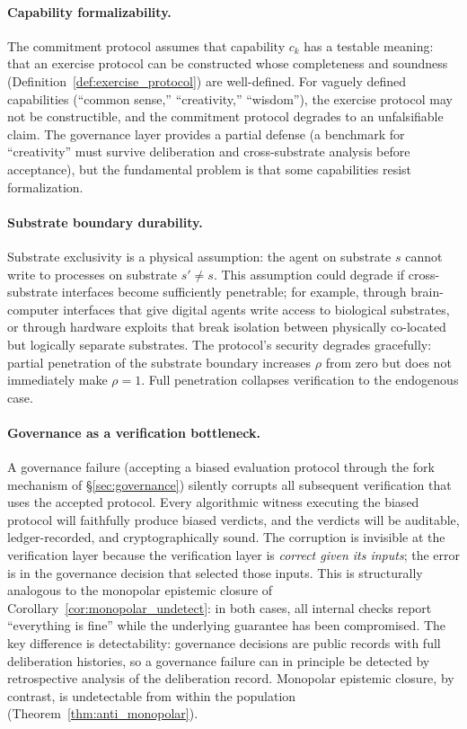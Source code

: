 \paragraph{Capability formalizability.}
The commitment protocol assumes that capability $c_k$ has a
testable meaning: that an exercise protocol can be constructed whose
completeness and soundness (Definition~\ref{def:exercise_protocol})
are well-defined.  For vaguely defined capabilities (``common
sense,'' ``creativity,'' ``wisdom''), the exercise protocol may not
be constructible, and the commitment protocol degrades to an
unfalsifiable claim.  The governance layer provides a partial defense
(a benchmark for ``creativity'' must survive deliberation and
cross-substrate analysis before acceptance), but the fundamental
problem is that some capabilities resist formalization.

\paragraph{Substrate boundary durability.}
Substrate exclusivity is a physical assumption: the agent on
substrate $s$ cannot write to processes on substrate $s' \neq s$.
This assumption could degrade if cross-substrate interfaces become
sufficiently penetrable; for example, through brain-computer
interfaces that give digital agents write access to biological
substrates, or through hardware exploits that break isolation
between physically co-located but logically separate substrates.
The protocol's security degrades gracefully: partial penetration of
the substrate boundary increases $\rho$ from zero but does not
immediately make $\rho = 1$.  Full penetration collapses verification
to the endogenous case.

\paragraph{Governance as a verification bottleneck.}
A governance failure (accepting a biased evaluation protocol through
the fork mechanism of \S\ref{sec:governance}) silently corrupts all
subsequent verification that uses the accepted protocol.  Every
algorithmic witness executing the biased protocol will faithfully
produce biased verdicts, and the verdicts will be auditable,
ledger-recorded, and cryptographically sound.  The corruption is
invisible at the verification layer because the verification layer
is \emph{correct given its inputs}; the error is in the governance
decision that selected those inputs.  This is structurally analogous
to the monopolar epistemic closure of
Corollary~\ref{cor:monopolar_undetect}: in both cases, all
internal checks report ``everything is fine'' while the underlying
guarantee has been compromised.  The key difference is detectability:
governance decisions are public records with full deliberation
histories, so a governance failure can in principle be detected by
retrospective analysis of the deliberation record.  Monopolar
epistemic closure, by contrast, is undetectable from within the
population (Theorem~\ref{thm:anti_monopolar}).

